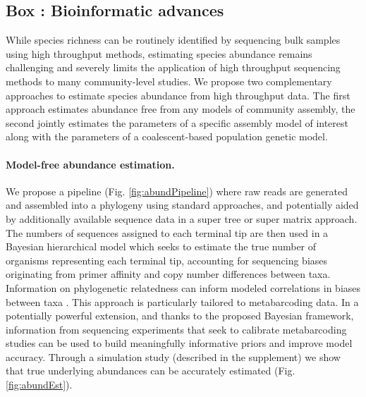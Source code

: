 \documentclass[12pt]{article}
\newcounter{Box}
\begin{document}
\label{box:dry}
\subsection*{Box \theBox: Bioinformatic advances}

    
    While species richness can be routinely identified by sequencing
    bulk samples using high throughput methods, estimating species
    abundance remains challenging \citep{elbrecht2015} and severely
    limits the application of high throughput sequencing methods to
    many community-level studies. We propose two complementary
    approaches to estimate species abundance from high throughput
    data.  The first approach estimates abundance free from any models
    of community assembly, the second jointly estimates the parameters
    of a specific assembly model of interest along with the parameters
    of a coalescent-based population genetic model.

    \paragraph{Model-free abundance estimation.} We propose a pipeline
    (Fig. \ref{fig:abundPipeline}) where raw reads are generated and
    assembled into a phylogeny using standard approaches, and
    potentially aided by additionally available sequence data in a
    super tree or super matrix approach. The numbers of sequences
    assigned to each terminal tip are then used in a Bayesian
    hierarchical model which seeks to estimate the true number of
    organisms representing each terminal tip, accounting for
    sequencing biases originating from primer affinity and copy number
    differences between taxa.  Information on phylogenetic relatedness
    can inform modeled correlations in biases between taxa
    \citep[e.g. copy number is known to be phylogenetically conserved
    at least in microbes]{angly2014}. This approach is particularly
    tailored to metabarcoding data. In a potentially powerful
    extension, and thanks to the proposed Bayesian framework,
    information from sequencing experiments that seek to calibrate
    metabarcoding studies \citep[e.g.,][]{krehenwinkel2016,
      Saitoh2016} can be used to build meaningfully informative priors
    and improve model accuracy. Through a simulation study (described
    in the supplement) we show that true underlying abundances can be
    accurately estimated (Fig. \ref{fig:abundEst}).
\end{document}

